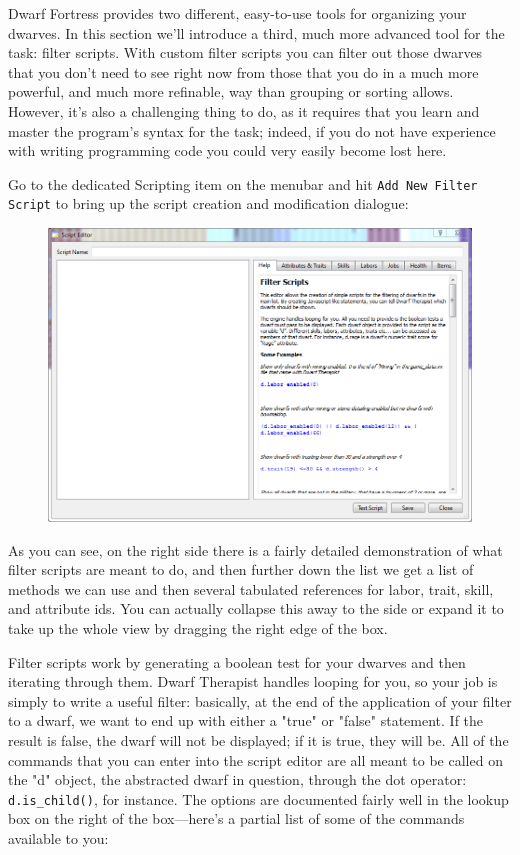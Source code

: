 \documentclass[]{article}
\begin{document}
Dwarf Fortress provides two different, easy-to-use tools for organizing your dwarves. In this section
we'll introduce a third, much more advanced tool for the task: filter scripts. With custom filter scripts
you can filter out those dwarves that you don't need to see right now from those that you do in a much
more powerful, and much more refinable, way than grouping or sorting allows. However, it's also a
challenging thing to do, as it requires that you learn and master the program's syntax for the task;
indeed, if you do not have experience with writing programming code you could very easily become lost
here.

Go to the dedicated Scripting item on the menubar and hit \texttt{Add New Filter Script} to bring up the
script creation and modification dialogue:

\begin{figure}[h!]
\vspace{-5pt}
\centering \includegraphics[width=\linewidth]{Sec4Fig1}
\vspace{-5pt}
\end{figure}

As you can see, on the right side there is a fairly detailed demonstration of what filter scripts are
meant to do, and then further down the list we get a list of methods we can use and then several
tabulated references for labor, trait, skill, and attribute ids. You can actually collapse this away to
the side or expand it to take up the whole view by dragging the right edge of the box.

Filter scripts work by generating a boolean test for your dwarves and then iterating through them. Dwarf
Therapist handles looping for you, so your job is simply to write a useful filter: basically, at the end
of the application of your filter to a dwarf, we want to end up with either a "true" or "false"
statement. If the result is false, the dwarf will not be displayed; if it is true, they will be. All of
the commands that you can enter into the script editor are all meant to be called on the "d" object, the
abstracted dwarf in question, through the dot operator: \texttt{d.is\_child()}, for instance. The
options are documented fairly well in the lookup box on the right of the box---here's a partial list of
some of the commands available to you:
\vspace{12pt}
\end{document}
